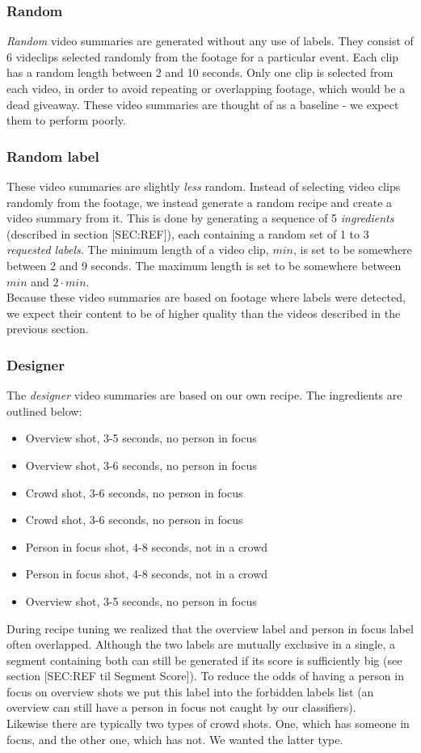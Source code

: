 \subsubsection{Random}
%
\textit{Random} video summaries are generated without any use of labels. They consist of 6 videclips selected randomly from the footage for a particular event. Each clip has a random length between 2 and 10 seconds. Only one clip is selected from each video, in order to avoid repeating or overlapping footage, which would be a dead giveaway. These video summaries are thought of as a baseline - we expect them to perform poorly.
%
\subsubsection{Random label}
%
These video summaries are slightly \textit{less} random. Instead of selecting video clips randomly from the footage, we instead generate a random recipe and create a video summary from it. This is done by generating a sequence of 5 \textit{ingredients} (described in section [SEC:REF]), each containing a random set of 1 to 3 \textit{requested labels}. The minimum length of a video clip, $min$, is set to be somewhere between 2 and 9 seconds. The maximum length is set to be somewhere between $min$ and $2 \cdot min$.\\
Because these video summaries are based on footage where labels were detected, we expect their content to be of higher quality than the videos described in the previous section.
%
\subsubsection{Designer}
%
The \textit{designer} video summaries are based on our own recipe. The ingredients are outlined below:
\begin{itemize}
\item Overview shot, 3-5 seconds, no person in focus
\item Overview shot, 3-6 seconds, no person in focus
\item Crowd shot, 3-6 seconds, no person in focus
\item Crowd shot, 3-6 seconds, no person in focus
\item Person in focus shot, 4-8 seconds, not in a crowd
\item Person in focus shot, 4-8 seconds, not in a crowd
\item Overview shot, 3-5 seconds, no person in focus
\end{itemize}
%
During recipe tuning we realized that the overview label and person in focus label often overlapped. Although the two labels are mutually exclusive in a single, a segment containing both can still be generated if its score is sufficiently big (see section [SEC:REF til Segment Score]). To reduce the odds of having a person in focus on overview shots we put this label into the forbidden labels list (an overview can still have a person in focus not caught by our classifiers).\\
Likewise there are typically two types of crowd shots. One, which has someone in focus, and the other one, which has not. We wanted the latter type.
%
